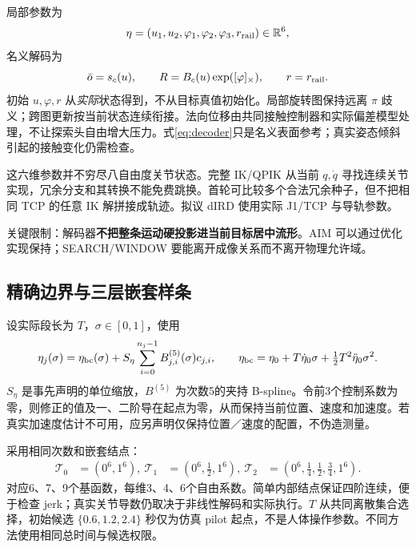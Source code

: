 \documentclass[UTF8,fontset=fandol,11pt,a4paper]{ctexart}
\theoremstyle{plain}
\theoremstyle{definition}
\theoremstyle{remark}
\numberwithin{equation}{section}
\newcommand{\R}{\mathbb R}
\begin{document}
局部参数为
\begin{equation}
\eta=(u_1,u_2,\varphi_1,\varphi_2,\varphi_3,r_{\rm rail})\in\R^6,
\end{equation}
名义解码为
\begin{equation}
\bar o=s_c(u),\qquad
R=B_c(u)\exp([\varphi]_\times),\qquad
r=r_{\rm rail}.
\label{eq:decoder}
\end{equation}
初始 $u,\varphi,r$ 从\emph{实际}状态得到，不从目标真值初始化。局部旋转图保持远离 $\pi$ 歧义；跨图更新按当前状态连续衔接。法向位移由共同接触控制器和实际偏差模型处理，不让探索头自由增大压力。式\eqref{eq:decoder}只是名义表面参考；真实姿态倾斜引起的接触变化仍需检查。

这六维参数并不穷尽八自由度关节状态。完整 IK/QPIK 从当前 $q,\dot q$ 寻找连续关节实现，冗余分支和其转换不能免费跳换。首轮可比较多个合法冗余种子，但不把相同 TCP 的任意 IK 解拼接成轨迹。拟议 dIRD 使用实际 J1/TCP 与导轨参数。

关键限制：解码器\textbf{不把整条运动硬投影进当前目标居中流形}。AIM 可以通过优化实现保持；SEARCH/WINDOW 要能离开成像关系而不离开物理允许域。

\subsection{精确边界与三层嵌套样条}
设实际段长为 $T$，$\sigma\in[0,1]$，使用
\begin{equation}
\eta_j(\sigma)=\eta_{\rm bc}(\sigma)+S_\eta\sum_{i=0}^{n_j-1}B^{(5)}_{j,i}(\sigma)c_{j,i},
\qquad
\eta_{\rm bc}=\eta_0+T\dot\eta_0\sigma+\tfrac12T^2\ddot\eta_0\sigma^2.
\label{eq:spline}
\end{equation}
$S_\eta$ 是事先声明的单位缩放，$B^{(5)}$ 为次数5的夹持 B-spline。令前3个控制系数为零，则修正的值及一、二阶导在起点为零，从而保持当前位置、速度和加速度。若真实加速度估计不可用，应另声明仅保持位置／速度的配置，不伪造测量。

采用相同次数和嵌套结点：
\begin{equation}
\begin{aligned}
\mathcal T_0&=(0^6,1^6),\
\mathcal T_1&=(0^6,\tfrac12,1^6),\
\mathcal T_2&=(0^6,\tfrac14,\tfrac12,\tfrac34,1^6).
\end{aligned}
\label{eq:knots}
\end{equation}
对应6、7、9个基函数，每维3、4、6个自由系数。简单内部结点保证四阶连续，便于检查 jerk；真实关节导数仍取决于非线性解码和实际执行。$T$ 从共同离散集合选择，初始候选 $\{0.6,1.2,2.4\}$ 秒仅为仿真 pilot 起点，不是人体操作参数。不同方法使用相同总时间与候选权限。
\end{document}
